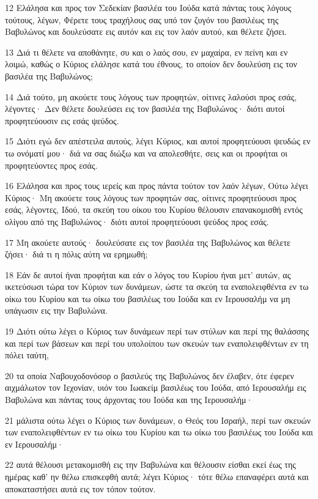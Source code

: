 \par 12 Ελάλησα και προς τον Σεδεκίαν βασιλέα του Ιούδα κατά πάντας τους λόγους τούτους, λέγων, Φέρετε τους τραχήλους σας υπό τον ζυγόν του βασιλέως της Βαβυλώνος και δουλεύσατε εις αυτόν και εις τον λαόν αυτού, και θέλετε ζήσει.
\par 13 Διά τι θέλετε να αποθάνητε, συ και ο λαός σου, εν μαχαίρα, εν πείνη και εν λοιμώ, καθώς ο Κύριος ελάλησε κατά του έθνους, το οποίον δεν δουλεύση εις τον βασιλέα της Βαβυλώνος;
\par 14 Διά τούτο, μη ακούετε τους λόγους των προφητών, οίτινες λαλούσι προς εσάς, λέγοντες· Δεν θέλετε δουλεύσει εις τον βασιλέα της Βαβυλώνος· διότι αυτοί προφητεύουσιν εις εσάς ψεύδος.
\par 15 Διότι εγώ δεν απέστειλα αυτούς, λέγει Κύριος, και αυτοί προφητεύουσι ψευδώς εν τω ονόματί μου· διά να σας διώξω και να απολεσθήτε, σεις και οι προφήται οι προφητεύοντες προς εσάς.
\par 16 Ελάλησα και προς τους ιερείς και προς πάντα τούτον τον λαόν λέγων, Ούτω λέγει Κύριος· Μη ακούετε τους λόγους των προφητών σας, οίτινες προφητεύουσι προς εσάς, λέγοντες, Ιδού, τα σκεύη του οίκου του Κυρίου θέλουσιν επανακομισθή εντός ολίγου από της Βαβυλώνος· διότι αυτοί προφητεύουσι ψεύδος προς εσάς.
\par 17 Μη ακούετε αυτούς· δουλεύσατε εις τον βασιλέα της Βαβυλώνος και θέλετε ζήσει· διά τι η πόλις αύτη να ερημωθή;
\par 18 Εάν δε αυτοί ήναι προφήται και εάν ο λόγος του Κυρίου ήναι μετ' αυτών, ας ικετεύσωσι τώρα τον Κύριον των δυνάμεων, ώστε τα σκεύη τα εναπολειφθέντα εν τω οίκω του Κυρίου και τω οίκω του βασιλέως του Ιούδα και εν Ιερουσαλήμ να μη υπάγωσιν εις την Βαβυλώνα.
\par 19 Διότι ούτω λέγει ο Κύριος των δυνάμεων περί των στύλων και περί της θαλάσσης και περί των βάσεων και περί του υπολοίπου των σκευών των εναπολειφθέντων εν τη πόλει ταύτη,
\par 20 τα οποία Ναβουχοδονόσορ ο βασιλεύς της Βαβυλώνος δεν έλαβεν, ότε έφερεν αιχμάλωτον τον Ιεχονίαν, υιόν του Ιωακείμ βασιλέως του Ιούδα, από Ιερουσαλήμ εις Βαβυλώνα και πάντας τους άρχοντας του Ιούδα και της Ιερουσαλήμ·
\par 21 μάλιστα ούτω λέγει ο Κύριος των δυνάμεων, ο Θεός του Ισραήλ, περί των σκευών των εναπολειφθέντων εν τω οίκω του Κυρίου και τω οίκω του βασιλέως του Ιούδα και εν Ιερουσαλήμ·
\par 22 αυτά θέλουσι μετακομισθή εις την Βαβυλώνα και θέλουσιν είσθαι εκεί έως της ημέρας καθ' ην θέλω επισκεφθή αυτά; λέγει Κύριος· τότε θέλω επαναφέρει αυτά και αποκαταστήσει αυτά εις τον τόπον τούτον.

